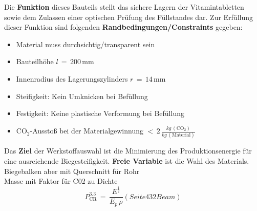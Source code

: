 Die \textbf{Funktion} dieses Bauteils stellt das sichere Lagern der Vitamintabletten sowie dem Zulassen einer optischen Prüfung des Füllstandes dar. Zur Erfüllung dieser Funktion sind folgenden \textbf{Randbedingungen/Constraints} gegeben:
\begin{itemize}
	\item Material muss durchsichtig/transparent sein
	\item Bauteilhöhe $l\,=\,200\,$mm
	\item Innenradius des Lagerungszylinders $r\,=\,14\,$mm
	\item Steifigkeit: Kein Umknicken bei Befüllung
	\item Festigkeit: Keine plastische Verformung bei Befüllung
	\item CO$_2$-Ausstoß bei der Materialgewinnung $<\,2\,\frac{kg\,(\text{CO}_2)}{kg\,(\text{Material})}$
\end{itemize}
Das \textbf{Ziel} der Werkstoffauswahl ist die Minimierung des Produktionsenergie für eine ausreichende Biegesteifigkeit. \textbf{Freie Variable} ist die Wahl des Materials.\\
Biegebalken aber mit Querschnitt für Rohr\\
Masse mit Faktor für C02 zu Dichte
\begin{equation} \label{zielfkt3}
P_{\text{CR}}^{3.3}\,=\,\frac{E^\frac{1}{2}}{E_p\,\rho} (Seite 432 Beam)
\end{equation}